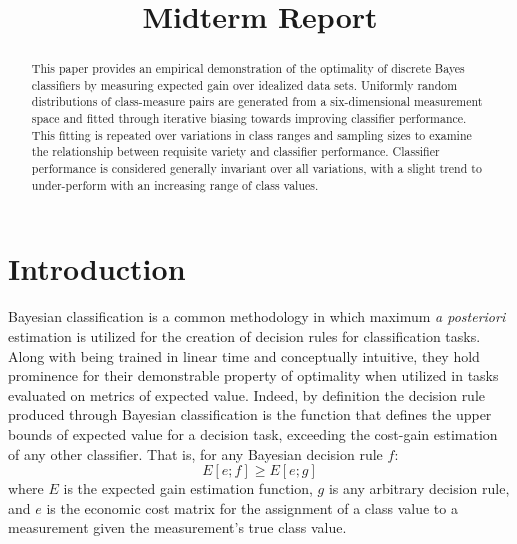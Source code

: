 \documentclass[10pt, conference]{IEEEtran}
\begin{document}
\title{Midterm Report\\
}

\author{
}

\maketitle

\begin{abstract}
This paper provides an empirical demonstration of the optimality of discrete Bayes classifiers by measuring expected gain over idealized data sets. Uniformly random distributions of class-measure pairs are generated from a six-dimensional measurement space and  fitted through iterative biasing towards improving classifier performance. This fitting is repeated over variations in class ranges and sampling sizes to examine the relationship between requisite variety and classifier performance. Classifier performance is considered generally invariant over all variations, with a slight trend to under-perform with an increasing range of class values.   
\end{abstract}

\section{Introduction}
	Bayesian classification is a common methodology in which maximum \textit{a posteriori} estimation is utilized for the creation of decision rules for classification tasks. Along with being trained in linear time \cite{b1} and conceptually intuitive, they hold prominence for their demonstrable property of optimality when utilized in tasks evaluated on metrics of expected value.  Indeed, by definition the decision rule produced through Bayesian classification is the function that defines the upper bounds of expected value for a decision task, exceeding the cost-gain estimation of any other classifier. That is, for any Bayesian decision rule $f$:
\begin{equation}
E[e; f] \geq E[e;g]
\end{equation}
where $E$ is the expected gain estimation function, $g$ is any arbitrary decision rule, and $e$ is the economic cost matrix for the assignment of a class value to a measurement given the measurement's true class value.   
\end{document}
